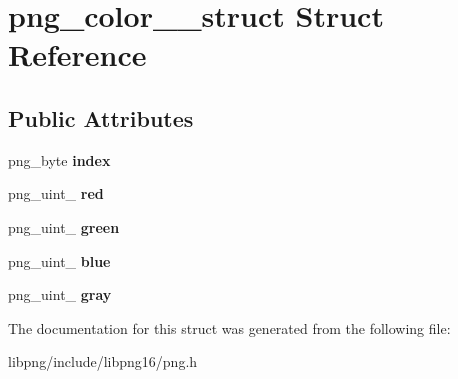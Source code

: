 \hypertarget{structpng__color__16__struct}{\section{png\-\_\-color\-\_\-\_\-struct Struct Reference}
\label{structpng__color__16__struct}
}
\subsection*{Public Attributes}
\begin{DoxyCompactItemize}
\item 
\hypertarget{structpng__color__16__struct_a44a918da0d9a50cf94fcad5a3c741ee0}{png\-\_\-byte {\bfseries index}}\label{structpng__color__16__struct_a44a918da0d9a50cf94fcad5a3c741ee0}

\item 
\hypertarget{structpng__color__16__struct_a069bad345aefbe4eab29fcc1d8af91e6}{png\-\_\-uint\-\_ {\bfseries red}}\label{structpng__color__16__struct_a069bad345aefbe4eab29fcc1d8af91e6}

\item 
\hypertarget{structpng__color__16__struct_af01259ffd46c78eff9b1ad584a295126}{png\-\_\-uint\-\_ {\bfseries green}}\label{structpng__color__16__struct_af01259ffd46c78eff9b1ad584a295126}

\item 
\hypertarget{structpng__color__16__struct_afd68833319d436582aa5911de7cdd46b}{png\-\_\-uint\-\_ {\bfseries blue}}\label{structpng__color__16__struct_afd68833319d436582aa5911de7cdd46b}

\item 
\hypertarget{structpng__color__16__struct_a660a572a0a2f4094408f2fecb61571ac}{png\-\_\-uint\-\_ {\bfseries gray}}\label{structpng__color__16__struct_a660a572a0a2f4094408f2fecb61571ac}

\end{DoxyCompactItemize}


The documentation for this struct was generated from the following file\-:\begin{DoxyCompactItemize}
\item 
libpng/include/libpng16/png.\-h\end{DoxyCompactItemize}
